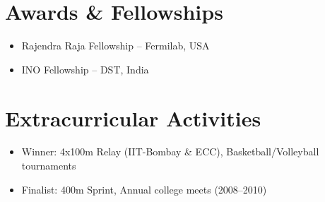 \documentclass[a4paper,10pt]{article}
\begin{document}
\section{Awards \& Fellowships}
\begin{itemize}[leftmargin=0.5cm]
  \item Rajendra Raja Fellowship – Fermilab, USA
  \item INO Fellowship – DST, India
\end{itemize}

\section{Extracurricular Activities}
\begin{itemize}[leftmargin=0.5cm]
  \item Winner: 4x100m Relay (IIT-Bombay \& ECC), Basketball/Volleyball tournaments
  \item Finalist: 400m Sprint, Annual college meets (2008–2010)
\end{itemize}
\end{document}
